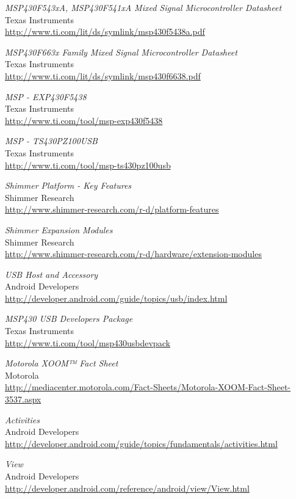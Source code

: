 \begin{thebibliography}{widest-label}
	\emph{MSP430F543xA, MSP430F541xA Mixed Signal Microcontroller Datasheet}\\
	Texas Instruments\\
	\url{http://www.ti.com/lit/ds/symlink/msp430f5438a.pdf}
	
	\emph{MSP430F663x Family Mixed Signal Microcontroller Datasheet}\\
	Texas Instruments\\
	\url{http://www.ti.com/lit/ds/symlink/msp430f6638.pdf}

	\emph{MSP - EXP430F5438}\\
	Texas Instruments\\
	\url{http://www.ti.com/tool/msp-exp430f5438}

	\emph{MSP - TS430PZ100USB}\\
	Texas Instruments\\
	\url{http://www.ti.com/tool/msp-ts430pz100usb}

	\emph{Shimmer Platform - Key Features}\\
	Shimmer Research\\
	\url{http://www.shimmer-research.com/r-d/platform-features}

	\emph{Shimmer Expansion Modules}\\
	Shimmer Research\\
	\url{http://www.shimmer-research.com/r-d/hardware/extension-modules}

	\emph{USB Host and Accessory}\\
	Android Developers\\
	\url{http://developer.android.com/guide/topics/usb/index.html}
	
	\emph{MSP430 USB Developers Package}\\
	Texas Instruments\\
	\url{http://www.ti.com/tool/msp430usbdevpack}
	
	\emph{Motorola XOOM™ Fact Sheet}\\
	Motorola\\
	\url{http://mediacenter.motorola.com/Fact-Sheets/Motorola-XOOM-Fact-Sheet-3537.aspx}

	\emph{Activities}\\
	Android Developers\\
	\url{http://developer.android.com/guide/topics/fundamentals/activities.html}
	
	\emph{View}\\
	Android Developers\\
	\url{http://developer.android.com/reference/android/view/View.html}

\end{thebibliography}
